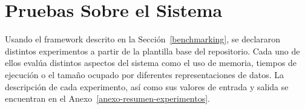 \section{Pruebas Sobre el Sistema}
\label{sec:pruebas-sistema}

Usando el framework descrito en la Sección~\ref{benchmarking}, se declararon distintos experimentos a partir de la plantilla base del repositorio. Cada uno de ellos evalúa distintos aspectos del sistema como el uso de memoria, tiempos de ejecución o el tamaño ocupado por diferentes representaciones de datos. La descripción de cada experimento, así como sus valores de entrada y salida se encuentran en el Anexo~\ref{anexo-resumen-experimentos}.


% 





% 



